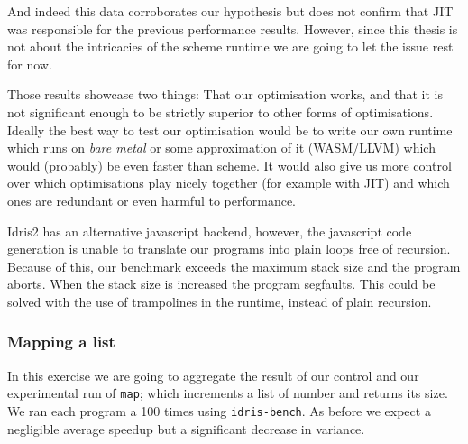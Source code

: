 \documentclass[
]{article}
\begin{document}
And indeed this data corroborates our hypothesis but does not confirm
that JIT was responsible for the previous performance results. However,
since this thesis is not about the intricacies of the scheme runtime we
are going to let the issue rest for now.

Those results showcase two things: That our optimisation works, and that
it is not significant enough to be strictly superior to other forms of
optimisations. Ideally the best way to test our optimisation would be to
write our own runtime which runs on \emph{bare metal} or some
approximation of it (WASM/LLVM) which would (probably) be even faster
than scheme. It would also give us more control over which optimisations
play nicely together (for example with JIT) and which ones are redundant
or even harmful to performance.

Idris2 has an alternative javascript backend, however, the javascript
code generation is unable to translate our programs into plain loops
free of recursion. Because of this, our benchmark exceeds the maximum
stack size and the program aborts. When the stack size is increased the
program segfaults. This could be solved with the use of trampolines in
the runtime, instead of plain recursion.

\hypertarget{mapping-a-list}{%
\subsubsection{Mapping a list}\label{mapping-a-list}}

In this exercise we are going to aggregate the result of our control and
our experimental run of \texttt{map}; which increments a list of number
and returns its size. We ran each program a 100 times using
\texttt{idris-bench}. As before we expect a negligible average speedup
but a significant decrease in variance.
\end{document}
